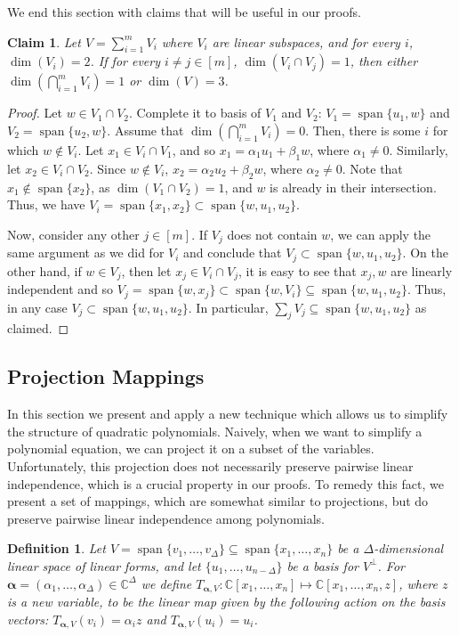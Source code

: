 \documentclass[10pt,a4paper]{article}
\newtheorem{definition}[theorem]{Definition}
\newtheorem{claim}[theorem]{Claim}
\newcommand{\vecalpha}{\boldsymbol{\alpha}}
\newcommand{\vaa}{{\vecalpha}}
\renewcommand{\C}{\mathbb{C}}
\newcommand{\MVar}[2]{{#1}_1,\ldots, {#1}_{#2}}
\newcommand{\PRing}[3]{\mathbb{#1}[ \MVar{#2}{#3}]}
\newcommand{\CRing}[2]{\PRing{C}{#1}{#2}}
\newcommand{\spn}[1]{\operatorname{span}\{{#1}\}}
\begin{document}
We end this section with claims that will be useful in our proofs. 

 
\begin{claim}\label{cla:linear-spaces-intersaction }
Let $V = \sum_{i=1}^m V_i$ where $V_i$ are linear subspaces, and for every $i$, $\dim(V_i) = 2$. If for every $i\neq j \in [m]$, $\dim(V_i\cap V_j) = 1$, then either $\dim(\bigcap_{i=1}^m V_i) = 1$ or $\dim(V)=3$. 
\end{claim}
\begin{proof}
Let  $w \in V_1\cap V_2$. Complete it to basis of $V_1$ and $V_2$: $V_1 = \spn{u_1,w}$ and  $V_2 = \spn{u_2,w}$. Assume that $\dim(\bigcap_{i=1}^m V_i) = 0$. Then, there is some $i$ for which $w \notin V_i$.
Let
$x_1 \in V_i\cap V_1$, and so $x_1 = \alpha_1 u_1 + \beta_1 w$, where $\alpha_1 \neq 0$. Similarly, let $x_2 \in V_i\cap V_2$. Since $w \notin V_i$, $x_2 = \alpha_2 u_2 + \beta_2 w$, where $\alpha_2 \neq 0$.  Note that $x_1 \notin \spn{ x_2}$, as $\dim(V_1\cap V_2) = 1$, and $w$ is already in their intersection. Thus, we have $V_i = \spn{x_1,x_2} \subset \spn{w, u_1, u_2}$.

Now, consider any other $j \in [m]$. If $V_j$ does not contain $w$, we can apply the same argument as we did for $V_i$ and conclude that $V_j \subset \spn{w,u_1,u_2}$. On the other hand, if $w \in V_j$, then let $x_j \in V_i\cap V_j$, it is easy to see that $x_j, w$ are linearly independent and so $V_j = \spn{w,x_j} \subset \spn{w,V_i} \subseteq \spn{w, u_1,u_2}$. Thus, in any case $V_j \subset \spn{w, u_1,u_2}$. In particular, $\sum_j V_j \subseteq \spn{w, u_1,u_2}$ as claimed.
\end{proof}
\subsection{Projection Mappings}\label{sec:z-map}

In this section we present and apply a new technique which allows us to simplify the structure of quadratic polynomials.
Naively, when we want to simplify a polynomial equation, we can project it on a subset of the variables.
Unfortunately, this projection does not necessarily preserve pairwise linear independence, which is a crucial property in our proofs. 
To remedy this fact, we present a set of mappings, which are somewhat similar to projections, but do preserve pairwise linear independence among polynomials.
\begin{definition}\label{def:z-mapping}
Let $V = \spn{\MVar{v}{\Delta}}\subseteq \spn{x_1,\ldots,x_n}$ be a $\Delta$-dimensional linear space of linear forms, and let $\{\MVar{u}{{n-\Delta}}\}$ be a basis for $V^\perp$. For $\vaa = (\MVar{\alpha}{\Delta})\in \C^{\Delta}$ we define $T_{\vaa, V} : \CRing{x}{n} \mapsto \C[\MVar{x}{n},z]$, where $z$ is a new variable, to be the linear map given by the following action on the basis vectors: $T_{\vaa, V}(v_i) = \alpha_i z$ and $T_{\vaa, V}(u_i)=u_i$.
\end{definition}
\end{document}
